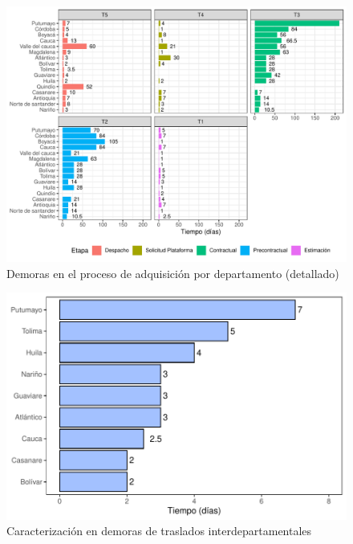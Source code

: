 \documentclass[
]{book}
\begin{document}
\begin{figure}
\includegraphics[width=0.85\linewidth]{InformeFinal_files/figure-latex/EtapasProcesoAdquisicionDetalle-1} \caption{Demoras en el proceso de adquisición por departamento (detallado)}\label{fig:EtapasProcesoAdquisicionDetalle}
\end{figure}

\begin{figure}
\includegraphics[width=0.85\linewidth]{InformeFinal_files/figure-latex/TiemposTranslados-1} \caption{Caracterización en demoras de traslados interdepartamentales}\label{fig:TiemposTranslados}
\end{figure}
\end{document}
